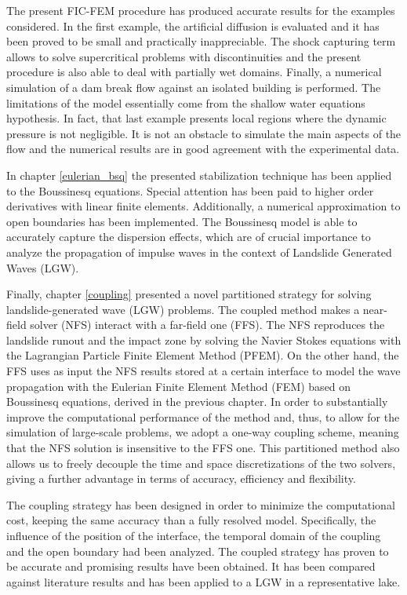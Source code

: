 The present FIC-FEM procedure has produced accurate results for the examples considered.
In the first example, the artificial diffusion is evaluated and it has been proved to be small and practically inappreciable. The shock capturing term allows to solve supercritical problems with discontinuities and the present procedure is also able to deal with partially wet domains. Finally, a numerical simulation of a dam break flow against an isolated building is performed.
The limitations of the model essentially come from the shallow water equations hypothesis. In fact, that last example presents local regions where the dynamic pressure is not negligible. It is not an obstacle to simulate the main aspects of the flow and the numerical results are in good agreement with the experimental data.

In chapter \ref{eulerian_bsq} the presented stabilization technique has been applied to the Boussinesq equations. Special attention has been paid to higher order derivatives with linear finite elements. Additionally, a numerical approximation to open boundaries has been implemented. The Boussinesq model is able to accurately capture the dispersion effects, which are of crucial importance to analyze the propagation of impulse waves in the context of Landslide Generated Waves (LGW).

Finally, chapter \ref{coupling} presented a novel partitioned strategy for solving landslide-generated wave (LGW) problems. The coupled method makes a near-field solver (NFS) interact with a far-field one (FFS). The NFS reproduces the landslide runout and the impact zone by solving the Navier Stokes equations with the Lagrangian Particle Finite Element Method (PFEM). On the other hand, the FFS uses as input the NFS results stored at a certain interface to model the wave propagation with the Eulerian Finite Element Method (FEM) based on Boussinesq equations, derived in the previous chapter. In order to substantially improve the computational performance of the method and, thus, to allow for the simulation of large-scale problems, we adopt a one-way coupling scheme, meaning that the NFS solution is insensitive to the FFS one. This partitioned method also allows us to freely decouple the time and space discretizations of the two solvers, giving a further advantage in terms of accuracy, efficiency and flexibility.

The coupling strategy has been designed in order to minimize the computational cost, keeping the same accuracy than a fully resolved model. Specifically, the influence of the position of the interface, the temporal domain of the coupling and the open boundary had been analyzed.
The coupled strategy has proven to be accurate and promising results have been obtained. It has been compared against literature results and has been applied to a LGW in a representative lake.

